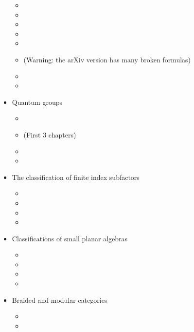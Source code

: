 \documentclass[12pt]{amsart}
\begin{document}
\begin{itemize}
  \begin{itemize}
  \item {}
  \item {}
  \item {}
  \item {}
  \item {}
  \item {} (Warning: the arXiv version has many broken formulas)
  \item {}
  \item {}
  \end{itemize}
\item Quantum groups
  \begin{itemize}
  \item {}
  \item {} (First 3 chapters)
  \item {}
  \item {}
  \end{itemize}
\item The classification of finite index subfactors
  \begin{itemize}
  \item {}
  \item {}
  \item {}
  \item {}
  \end{itemize}
\item Classifications of small planar algebras
  \begin{itemize}
   \item {}
   \item {}
   \item {}
   \item {}
  \end{itemize}
\item Braided and modular categories
  \begin{itemize}
    \item {}
    \item {}
  \end{itemize}
\end{itemize}





\end{document}
